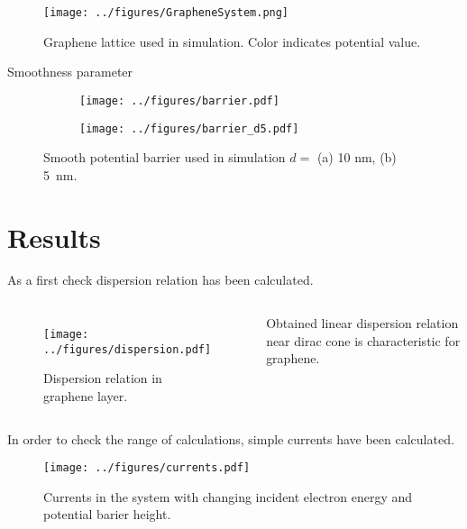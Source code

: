 \documentclass{beamer}
\begin{document}
\begin{frame}
	\begin{figure}
		\begin{center}
			\texttt{[image: ../figures/GrapheneSystem.png]}
		\end{center}
		\caption{Graphene lattice used in simulation. Color indicates potential value.}
	\end{figure}
\end{frame}

\begin{frame}{Smoothness parameter}
	\begin{figure}
		\centering
		\begin{subfigure}{0.49\textwidth}
			\texttt{[image: ../figures/barrier.pdf]}
			\caption{}
		\end{subfigure}
		\begin{subfigure}{0.49\textwidth}
			\texttt{[image: ../figures/barrier\_d5.pdf]}
			\caption{}
		\end{subfigure}
		\caption{Smooth potential barrier used in simulation $d = $ (a) 10 nm, (b) 5~nm.}
	\end{figure}
\end{frame}

\section{Results}

\begin{frame}
	As a first check dispersion relation has been calculated.
	\begin{columns}
		\begin{figure}
			\begin{center}
				\texttt{[image: ../figures/dispersion.pdf]}
			\end{center}
			\caption{Dispersion relation in graphene layer.}
		\end{figure}
        \hspace{0.03\textwidth}
        Obtained linear dispersion relation near dirac cone is characteristic for graphene. 
	\end{columns}
\end{frame}

\begin{frame}
    In order to check the range of calculations, simple currents have been calculated.
    \begin{figure}
        \begin{center}
            \texttt{[image: ../figures/currents.pdf]}
        \end{center}
        \caption{Currents in the system with changing incident electron energy and potential barier height.}
    \end{figure}
\end{frame}
\end{document}
